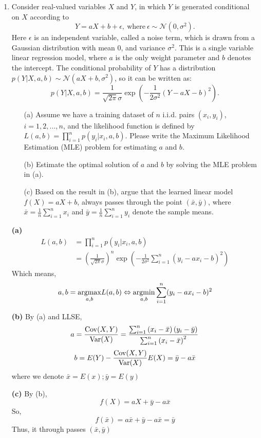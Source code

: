 \documentclass[10pt]{article}
\begin{document}
\begin{enumerate}[1.]
	\item {} Consider real-valued variables $X$ and $Y$, in which $Y$ is generated conditional on $X$ according to
	      $$
		      Y = aX + b + \epsilon, \ \text{where} \ \epsilon \sim \mathcal{N}(0, \sigma^2).
	      $$
	      Here $\epsilon$ is an independent variable, called a noise term, which is drawn from a Gaussian distribution with mean 0,
	      and variance $\sigma^2$. This is a single variable linear regression model, where $a$ is the only weight parameter and $b$ denotes the intercept.
	      The conditional probability of $Y$ has a distribution $p(Y | X, a, b) \sim \mathcal{N}(aX+b, \sigma^2)$, so it can be written as:
	      $$
		      p(Y|X, a,b) = \frac{1}{\sqrt{2\pi}\sigma}\exp\left(-\frac{1}{2\sigma^2}(Y - aX -b)^2\right).
	      $$
	      \begin{itemize}
		      \item[(a)] Assume we have a training dataset of $n$ i.i.d. pairs $(x_i, y_i)$, $i = 1, 2, ..., n$, and
		            the likelihood function is defined by $L(a,b) = \prod_{i=1}^n p(y_i | x_i, a, b)$. Please write the
		            Maximum Likelihood Estimation (MLE) problem for estimating $a$ and $b$.~
		      \item[(b)] Estimate the optimal solution of $a$ and $b$ by solving the MLE problem in (a).~
		      \item[(c)] Based on the result in (b), argue that the learned linear model $f(X) = aX + b$,
		            always passes through the point $(\bar{x},\bar{y})$,
		            where $\bar{x} = \tfrac{1}{n}\sum_{i=1}^{n}x_{i}$ and $\bar{y} = \tfrac{1}{n}\sum_{i=1}^{n}y_{i}$ denote the sample means.~
	      \end{itemize}
		\item[\textbf{(a)}] 
		$$
		\begin{aligned}
		L(a,b) &=\prod_{i=1}^n p(y_i|x_i,a,b) 
		\\&= \left(\frac{1}{\sqrt{2\pi}\sigma}\right)^n\exp \left(-\frac{1}{2\sigma^2}\sum_{i=1}^{n}(y_i-ax_i-b)^2\right)
		\end{aligned} 
		$$
		Which means, 
		$$
		\begin{aligned}
		a,b = \underset{a,b}{\mathop{\rm argmax}} L(a,b)\Leftrightarrow \underset{a,b}{\mathop{\rm argmin}} \sum_{i=1}^{n}(y_i-ax_i-b)^2
		\end{aligned} 
		$$
		\item[\textbf{(b)}] 
		By (a) and LLSE,
		$$
		\begin{aligned}
		a = \frac{\mathrm{Cov}(X,Y)}{\mathrm{Var}(X)} = \frac{\sum_{i=1}^{n}\left(x_i-\bar{x}\right)\left(y_{i}-\bar{y}\right)}{\sum_{i=1}^{n}\left(x_{i}-\bar{x}\right)^{2}}
		\end{aligned} 
		$$
		$$
		\begin{aligned}
		b = E(Y) -\frac{\mathrm{Cov}(X,Y)}{\mathrm{Var}(X)}E(X) = \bar{y} - a\bar{x} 
		\end{aligned} 
		$$
		where we denote $\bar{x}=E(x);\bar{y}=E(y)$
		\item[\textbf{(c)}] 
		By (b), 
		$$f(X) = aX+\bar{y} - a\bar{x}$$
		So,$$f(\bar{x}) = a\bar{x} + \bar{y} - a\bar{x} = \bar{y}$$
		Thus, it through passes $(\bar{x},\bar{y})$




\end{enumerate}
\end{document}
